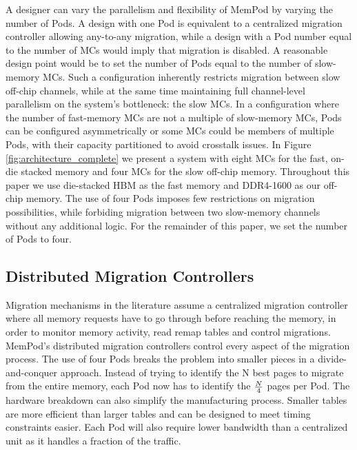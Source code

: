 A designer can vary the parallelism and flexibility of MemPod by varying the
number of Pods. A design with one Pod is equivalent to a centralized 
migration controller allowing any-to-any migration,
while a design with a Pod number equal to the number of MCs would imply that migration is disabled. A reasonable design point would be to set the number of Pods equal to the number of slow-memory MCs. Such a configuration inherently restricts migration between slow off-chip channels, while at the same time maintaining full channel-level parallelism on the system's bottleneck: the slow MCs. In a configuration where the number of fast-memory MCs are not a multiple of slow-memory MCs, Pods can be configured asymmetrically or some MCs could be members of multiple Pods, with their capacity partitioned to avoid crosstalk issues. In Figure \ref{fig:architecture_complete} we present a system with eight MCs for the fast, on-die stacked memory and four MCs for the slow off-chip memory. Throughout this paper we use die-stacked HBM as the fast memory \cite{JEDEC-HBM-REVISED} and DDR4-1600 as our off-chip memory. The use of four Pods imposes few restrictions on migration possibilities, while forbiding migration between two slow-memory channels without any additional logic. For the remainder of this paper, we set the number of Pods to four.

\subsection{Distributed Migration Controllers}


Migration mechanisms in the literature \cite{sim-micro2014,cameo} assume a centralized migration controller where all memory requests have to go through before reaching the memory, in order to monitor memory activity, read remap tables and control migrations. MemPod's distributed migration controllers control every aspect of the migration process. The use of four Pods breaks the problem into smaller pieces in a divide-and-conquer approach. Instead of trying to identify the N best pages to migrate from the entire memory, each Pod now has to identify the $N\over4$ pages per Pod. The hardware breakdown can also simplify the manufacturing process. Smaller tables are more efficient than larger tables and can be designed to meet timing constraints easier. Each Pod will also require lower bandwidth than a centralized unit as it handles a fraction of the traffic.

